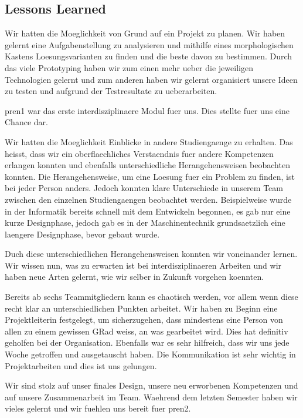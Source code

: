 \subsection{Lessons Learned}

Wir hatten die Moeglichkeit von Grund auf ein Projekt zu planen. Wir haben gelernt eine Aufgabenstellung zu analysieren und mithilfe eines morphologischen Kastens Loesungsvarianten zu finden und die beste davon zu bestimmen. Durch das viele Prototyping haben wir zum einen mehr ueber die jeweiligen Technologien gelernt und zum anderen haben wir gelernt organisiert unsere Ideen zu testen und aufgrund der Testresultate zu ueberarbeiten.

\acrshort{pren1} war das erste interdisziplinaere Modul fuer uns. Dies stellte fuer uns eine Chance dar.

Wir hatten die Moeglichkeit Einblicke in andere Studiengaenge zu erhalten. Das heisst, dass wir ein oberflaechliches Verstaendnis fuer andere Kompetenzen erlangen konnten und ebenfalls unterschiedliche Herangehensweisen beobachten konnten.
Die Herangehensweise, um eine Loesung fuer ein Problem zu finden, ist bei jeder Person anders. Jedoch konnten klare Unterschiede in unserem Team zwischen den einzelnen Studiengaengen beobachtet werden.
Beispielweise wurde in der Informatik bereits schnell mit dem Entwickeln begonnen, es gab nur eine kurze Designphase, jedoch gab es in der Maschinentechnik grundsaetzlich eine laengere Designphase, bevor gebaut wurde.

Duch diese unterschiedlichen Herangehensweisen konnten wir voneinander lernen.
Wir wissen nun, was zu erwarten ist bei interdisziplinaeren Arbeiten und wir haben neue Arten gelernt, wie wir selber  in Zukunft vorgehen koennten.

Bereits ab sechs Teammitgliedern kann es chaotisch werden, vor allem wenn diese recht klar an unterschiedlichen Punkten arbeitet.
Wir haben zu Beginn eine Projektleiterin festgelegt, um sicherzugehen, dass mindestens eine Person von allen zu einem gewissen GRad weiss, an was gearbeitet wird.
Dies hat definitiv geholfen bei der Organisation. Ebenfalls war es sehr hilfreich, dass wir uns jede Woche getroffen und ausgetauscht haben. Die Kommunikation ist sehr wichtig in Projektarbeiten und dies ist uns gelungen.

Wir sind stolz auf unser finales Design, unsere neu erworbenen Kompetenzen und auf unsere Zusammenarbeit im Team. Waehrend dem letzten Semester haben wir vieles gelernt und wir fuehlen uns bereit fuer \acrshort{pren2}.



